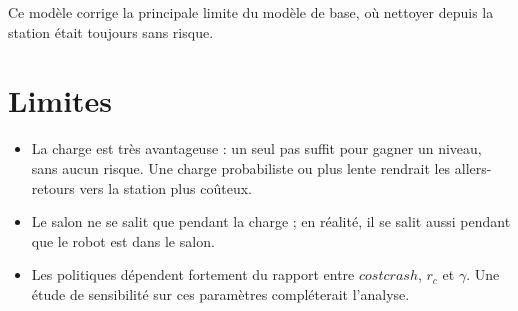 \documentclass[11pt,a4paper]{article}
\begin{document}
Ce modèle corrige la principale limite du modèle de base, où nettoyer depuis la station était toujours sans risque.

\section{Limites}

\begin{itemize}
  \item La charge est très avantageuse : un seul pas suffit pour gagner un niveau, sans aucun risque. Une charge
        probabiliste ou plus lente rendrait les allers-retours vers la station plus coûteux.
  \item Le salon ne se salit que pendant la charge ; en réalité, il se salit aussi pendant que le robot est dans le salon.
  \item Les politiques dépendent fortement du rapport entre $\mathit{costcrash}$, $r_c$ et $\gamma$. Une étude de
        sensibilité sur ces paramètres compléterait l'analyse.
\end{itemize}
\end{document}

